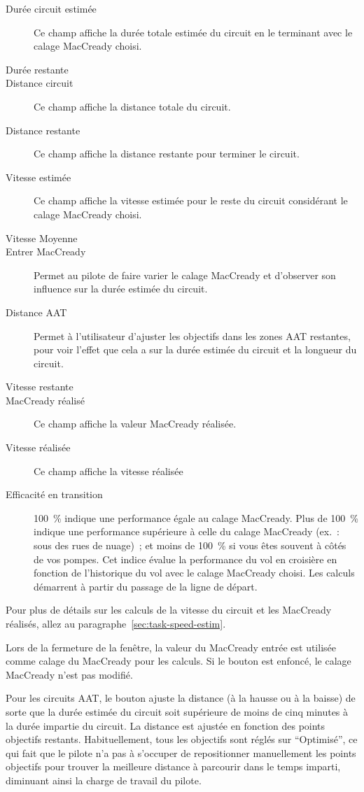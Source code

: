 \begin{description}
\item[Durée circuit estimée] Ce champ affiche la durée totale estimée
du circuit en le terminant avec le calage MacCready choisi.
\item[Durée restante] %
\item[Distance circuit] Ce champ affiche la distance totale du circuit.
\item[Distance restante] Ce champ affiche la distance restante pour terminer le circuit.
\item[Vitesse estimée] Ce champ affiche la vitesse estimée pour le
reste du circuit considérant le calage MacCready choisi.
\item[Vitesse Moyenne] %
\item[Entrer MacCready] Permet au pilote de faire varier le calage MacCready et d'observer son influence sur la durée estimée du circuit.
\item[Distance AAT] Permet à l'utilisateur d'ajuster les objectifs dans les zones AAT
restantes, pour voir l'effet que cela a sur la durée estimée du circuit et la longueur du circuit.
\item[Vitesse restante]
\item[MacCready réalisé] Ce champ affiche la valeur MacCready réalisée.
\item[Vitesse réalisée] Ce champ affiche la vitesse réalisée %
\item[Efficacité en transition] 100~\% indique une performance égale au calage MacCready. Plus de 100~\% indique une performance supérieure à celle du calage MacCready (ex.~: sous des rues de nuage)~; et moins de 100~\% si vous êtes souvent à côtés de vos pompes.
Cet indice évalue la performance du vol en croisière en fonction de l'historique du vol avec le calage MacCready choisi.
Les calculs démarrent à partir du passage de la ligne de départ.
\end{description}
Pour plus de détails sur les calculs de la vitesse du circuit et les MacCready réalisés, allez au paragraphe~\ref{sec:task-speed-estim}.

Lors de la fermeture de la fenêtre, la valeur du MacCready entrée est utilisée comme calage du
MacCready pour les calculs. Si le bouton  est enfoncé, le calage MacCready n'est pas modifié.

Pour les circuits AAT, le bouton  ajuste la distance
(à la hausse ou à la baisse) de sorte que la durée estimée du circuit soit supérieure de moins de cinq minutes à la durée impartie du circuit. La distance est ajustée en fonction
des points objectifs restants. Habituellement, tous les objectifs sont réglés sur ``Optimisé'', ce qui fait que le pilote
n'a pas à s'occuper de repositionner manuellement les points objectifs pour trouver la meilleure distance à parcourir dans le temps imparti, diminuant ainsi la charge de travail du pilote.

